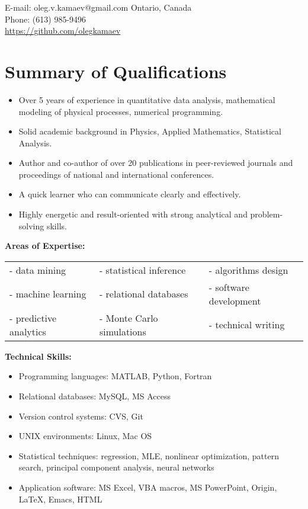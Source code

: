 \documentclass[overlapped, line, 10pt]{res}
\begin{document}
\renewcommand{\namefont}{\Large\textbf}


\begin{resume}

\hspace*{-\sectionwidth}E-mail:  oleg.v.kamaev@gmail.com \hfill Ontario, Canada\\
\hspace*{-\sectionwidth}Phone: (613) 985-9496\\
\hspace*{-\sectionwidth}\url{https://github.com/olegkamaev}

\section{\sc Summary of Qualifications}
\setlength{\leftmargini}{1 em}
\begin{itemize}
\item Over 5 years of experience in quantitative data analysis, mathematical modeling of physical processes, numerical programming.
\item Solid academic background in Physics, Applied Mathematics, Statistical Analysis.
\item Author and co-author of over 20 publications in peer-reviewed journals and proceedings of national and international conferences. 
\item A quick learner who can communicate clearly and effectively. 
\item Highly energetic and result-oriented with strong analytical and problem-solving skills.
\end{itemize}
\textbf{Areas of Expertise:}\\
\begin{tabular}{p{5cm} p{5cm} p{5cm}}
- data mining & - statistical inference  & - algorithms design \\
- machine learning & - relational databases & - software development \\
- predictive analytics & - Monte Carlo simulations & - technical writing
\end{tabular}

\textbf{Technical Skills:}
\begin{itemize}
\item Programming languages: MATLAB, Python, Fortran
\item Relational databases: MySQL, MS Access
\item Version control systems: CVS, Git
\item UNIX environments: Linux, Mac OS
\item Statistical techniques: regression, MLE, nonlinear optimization, pattern search, principal component analysis, neural networks
\item Application software: MS Excel, VBA macros, MS PowerPoint, Origin, LaTeX, Emacs, HTML
\end{itemize}


\end{resume}
\end{document}
